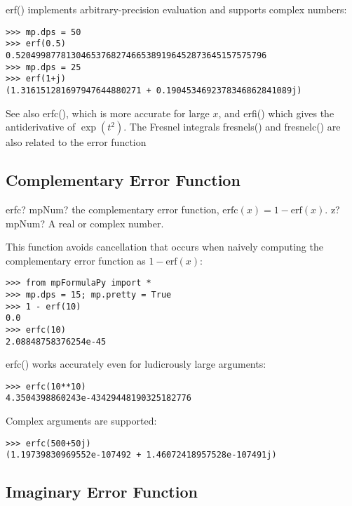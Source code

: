 erf() implements arbitrary-precision evaluation and supports complex numbers:
\begin{lstlisting}
>>> mp.dps = 50
>>> erf(0.5)
0.52049987781304653768274665389196452873645157575796
>>> mp.dps = 25
>>> erf(1+j)
(1.316151281697947644880271 + 0.1904534692378346862841089j)
\end{lstlisting}

See also erfc(), which is more accurate for large $x$, and erfi() which gives the antiderivative of $\exp(t^2)$.
The Fresnel integrals fresnels() and fresnelc() are also related to the error function


\subsection{Complementary Error Function}

\begin{mpFunctionsExtract}
	\mpFunctionOne
	{erfc? mpNum? the complementary error function, $\text{erfc}(x)=1-\text{erf}(x)$.}
	{z? mpNum? A real or complex number.}
\end{mpFunctionsExtract}

\vpara
This function avoids cancellation that occurs when naively computing the complementary error function as $1-\text{erf}(x)$:

\begin{lstlisting}
>>> from mpFormulaPy import *
>>> mp.dps = 15; mp.pretty = True
>>> 1 - erf(10)
0.0
>>> erfc(10)
2.08848758376254e-45
\end{lstlisting}

erfc() works accurately even for ludicrously large arguments:

\begin{lstlisting}
>>> erfc(10**10)
4.3504398860243e-43429448190325182776
\end{lstlisting}

Complex arguments are supported:

\begin{lstlisting}
>>> erfc(500+50j)
(1.19739830969552e-107492 + 1.46072418957528e-107491j)
\end{lstlisting}



\subsection{Imaginary Error Function}

